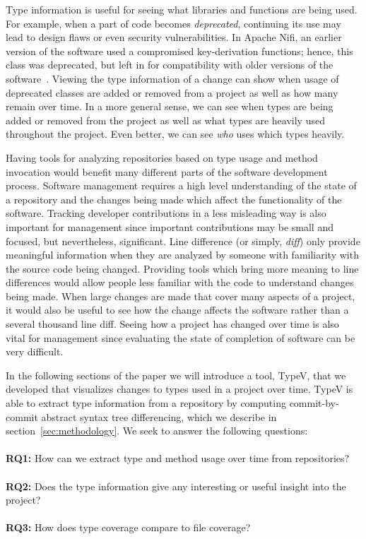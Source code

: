 Type information is useful for seeing what libraries and functions are being used.  For example, when a part of code becomes \emph{deprecated}, continuing its use may lead to design flaws or even security vulnerabilities. In Apache Nifi, an earlier version of the software used a compromised key-derivation functions; hence, this class was deprecated, but left in for compatibility with older versions of the software~\cite{nifi}. Viewing the type information of a change can show when usage of deprecated classes are added or removed from a project as well as how many remain over time. In a more general sense, we can see when types are being added or removed from the project as well as what types are heavily used throughout the project. Even better, we can see \emph{who} uses which types heavily.

Having tools for analyzing repositories based on type usage and method invocation would benefit many different parts of the software development process. Software management requires a high level understanding of the state of a repository and the changes being made which affect the functionality of the software. Tracking developer contributions in a less misleading way is also important for management since important contributions may be small and focused, but nevertheless, significant. Line difference (or simply, \emph{diff}) only provide meaningful information when they are analyzed by someone with familiarity with the source code being changed. Providing tools which bring more meaning to line differences would allow people less familiar with the code to understand changes being made. When large changes are made that cover many aspects of a project, it would also be useful to see how the change affects the software rather than a several thousand line diff.  Seeing how a project has changed over time is also vital for management since evaluating the state of completion of software can be very difficult.

In the following sections of the paper we will introduce a tool, TypeV, that we developed that visualizes changes to types used in a project over time. TypeV is able to extract type information from a repository by computing commit-by-commit abstract syntax tree differencing, which we describe in section~\ref{sec:methodology}. We seek to answer the following questions: \\ \\
\textbf{RQ1:} How can we extract type and method usage over time from repositories? \\ \\
\textbf{RQ2:} Does the type information give any interesting or useful insight into the project? \\ \\
\textbf{RQ3:} How does type coverage compare to file coverage?

